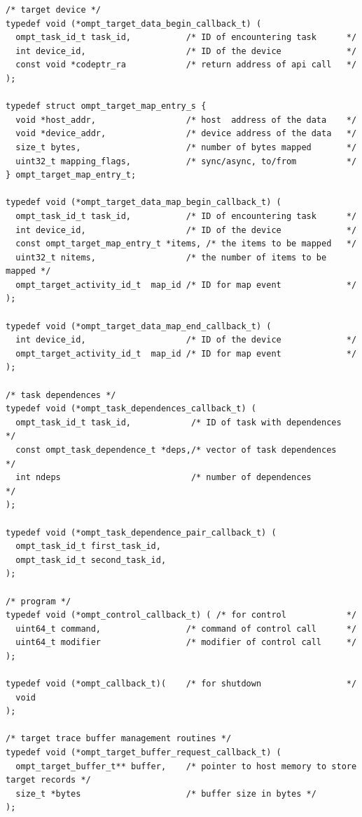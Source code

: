 \documentclass{article}
\begin{document}
{\begin{verbatim}
/* target device */
typedef void (*ompt_target_data_begin_callback_t) ( 
  ompt_task_id_t task_id,           /* ID of encountering task      */
  int device_id,                    /* ID of the device             */
  const void *codeptr_ra            /* return address of api call   */
);

typedef struct ompt_target_map_entry_s {
  void *host_addr,                  /* host  address of the data    */
  void *device_addr,                /* device address of the data   */ 
  size_t bytes,                     /* number of bytes mapped       */
  uint32_t mapping_flags,           /* sync/async, to/from          */
} ompt_target_map_entry_t;

typedef void (*ompt_target_data_map_begin_callback_t) (
  ompt_task_id_t task_id,           /* ID of encountering task      */
  int device_id,                    /* ID of the device             */
  const ompt_target_map_entry_t *items, /* the items to be mapped   */
  uint32_t nitems,                  /* the number of items to be mapped */
  ompt_target_activity_id_t  map_id /* ID for map event             */
);

typedef void (*ompt_target_data_map_end_callback_t) (
  int device_id,                    /* ID of the device             */
  ompt_target_activity_id_t  map_id /* ID for map event             */
);

/* task dependences */
typedef void (*ompt_task_dependences_callback_t) (                                   
  ompt_task_id_t task_id,            /* ID of task with dependences  */
  const ompt_task_dependence_t *deps,/* vector of task dependences   */
  int ndeps                          /* number of dependences        */
);

typedef void (*ompt_task_dependence_pair_callback_t) (                                   
  ompt_task_id_t first_task_id,    
  ompt_task_id_t second_task_id,        
);  
        
/* program */						   
typedef void (*ompt_control_callback_t) ( /* for control            */	   
  uint64_t command,                 /* command of control call      */
  uint64_t modifier                 /* modifier of control call     */
);
  
typedef void (*ompt_callback_t)(    /* for shutdown                 */
  void
); 

/* target trace buffer management routines */
typedef void (*ompt_target_buffer_request_callback_t) (
  ompt_target_buffer_t** buffer,    /* pointer to host memory to store target records */
  size_t *bytes                     /* buffer size in bytes */
);
  

\end{verbatim}}
\end{document}
